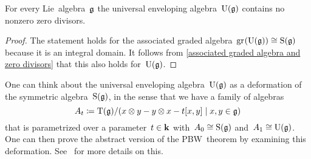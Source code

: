 \begin{corollary}
  \label{uea contains no zero divisors}
  For every Lie~algebra~$\mathfrak{g}$ the universal enveloping algebra~$\operatorname{U}(\mathfrak{g})$ contains no nonzero zero divisors.
\end{corollary}


\begin{proof}
  The statement holds for the associated graded algebra~$\gr(\Univ(\glie)) \cong \Symm(\glie)$ because it is an integral domain.
  It follows from \cref{associated graded algebra and zero divisors} that this also holds for~$\operatorname{U}(\mathfrak{g})$.
\end{proof}


\begin{remark}
  One can think about the universal enveloping algebra~$\operatorname{U}(\mathfrak{g})$ as a deformation of the symmetric algebra~$\operatorname{S}(\mathfrak{g})$, in the sense that we have a family of algebras
  \[
    A_t
    \defined
    \Tensor(\glie)/(x \tensor y - y \tensor x - t[x,y] \suchthat x, y \in \glie)
  \]
  that is parametrized over a parameter~$t \in \mathbf{k}$ with~$A_0 \cong \operatorname{S}(\mathfrak{g})$ and~$A_1 \cong \operatorname{U}(\mathfrak{g})$.
  One can then prove the abstract version of the PBW~theorem by examining this deformation.
  See~\cite{pbw_deformation} for more details on this.
\end{remark}




